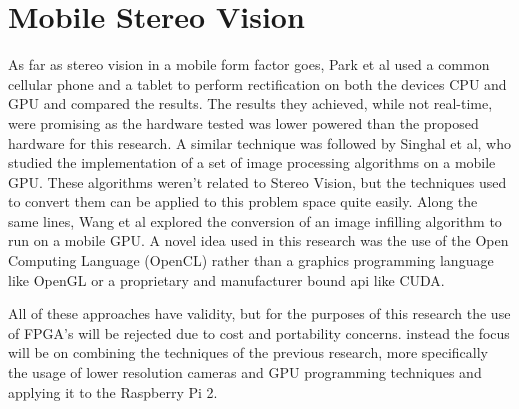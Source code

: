 \section{Mobile Stereo Vision}
As far as stereo vision in a mobile form factor goes, Park et al used a common cellular phone and
a tablet to perform rectification on both the devices CPU and GPU and compared the results.\cite{Park}
The results they achieved, while not real-time, were promising as the hardware tested was lower
powered than the proposed hardware for this research. A similar technique was followed by Singhal
et al, who studied the implementation of a set of image processing algorithms on a mobile GPU.\cite{Singhal}
These algorithms weren’t related to Stereo Vision, but the techniques used to convert them can be
applied to this problem space quite easily. Along the same lines, Wang et al explored the conversion
of an image infilling algorithm to run on a mobile GPU.\cite{Wang:2} A novel idea used in this research was
the use of the Open Computing Language (OpenCL) rather than a graphics programming language
like OpenGL or a proprietary and manufacturer bound api like CUDA.

All of these approaches have validity, but for the purposes of this research the use of FPGA’s
will be rejected due to cost and portability concerns. instead the focus will be on combining the
techniques of the previous research, more specifically the usage of lower resolution cameras and
GPU programming techniques and applying it to the Raspberry Pi 2.